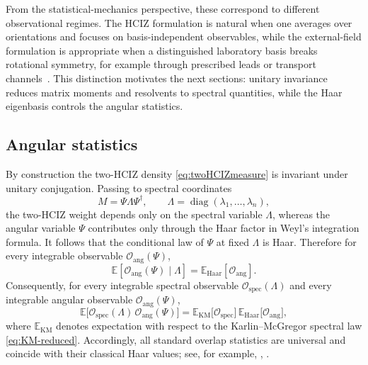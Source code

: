 \documentclass[11pt,a4paper]{article}
\theoremstyle{definition}\newtheorem{definition}[theorem]{Definition}
\theoremstyle{remark}\newtheorem{remark}[theorem]{Remark}
\numberwithin{equation}{section}
\DeclareMathOperator{\diag}{diag}
\newcommand{\EE}{\mathbb{E}}
\begin{document}
From the statistical-mechanics perspective, these correspond to different
observational regimes. The HCIZ formulation is natural when one averages over orientations and focuses on basis-independent observables, while the
external-field formulation is appropriate when a distinguished laboratory basis breaks rotational symmetry, for example through prescribed leads or transport channels~\cite{JKMS2023,Beenakker1997}. This distinction motivates the next sections: unitary invariance reduces matrix moments and resolvents to spectral quantities, while the Haar eigenbasis controls the angular statistics.
 


 
\subsection{Angular statistics}

By construction the two-HCIZ density \eqref{eq:twoHCIZmeasure} is invariant
under unitary conjugation. Passing to spectral coordinates
\begin{equation}
M=\Psi\Lambda\Psi^\dagger,
\qquad
\Lambda=\diag(\lambda_1,\dots,\lambda_n),
\end{equation}
the two-HCIZ weight depends only on the spectral variable $\Lambda$, whereas
the angular variable $\Psi$ contributes only through the Haar factor in Weyl's
integration formula. It follows that the conditional law of $\Psi$ at fixed
$\Lambda$ is Haar. Therefore for every integrable observable $\mathcal O_{\mathrm{ang}}(\Psi)$,
\begin{equation}
\EE \!\left[\mathcal O_{\mathrm{ang}}(\Psi)\mid \Lambda\right]
=
\EE_{\mathrm{Haar}}\!\left[\mathcal O_{\mathrm{ang}}\right].
\end{equation}
 Consequently, for every integrable spectral observable $\mathcal O_{\mathrm{spec}}(\Lambda)$ and every integrable angular observable $\mathcal O_{\mathrm{ang}}(\Psi)$,
\begin{equation}
\EE \big[\mathcal O_{\mathrm{spec}}(\Lambda)\,\mathcal O_{\mathrm{ang}}(\Psi)\big]
=
\EE_{\mathrm{KM}}\big[\mathcal O_{\mathrm{spec}}\big]\,
\EE_{\mathrm{Haar}}\big[\mathcal O_{\mathrm{ang}}\big],
\end{equation}
where $\EE_{\mathrm{KM}}$ denotes expectation with respect to the
Karlin--McGregor spectral law \eqref{eq:KM-reduced}. Accordingly, all standard overlap statistics are universal and coincide with
their classical Haar values; see, for example,
\cite{Mehta2004}, \cite{AGZ2010}.
\end{document}
